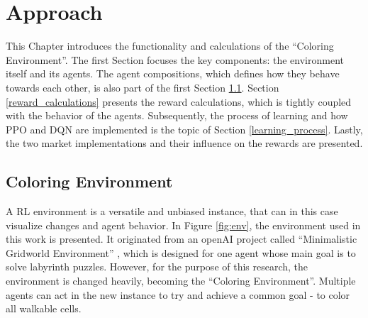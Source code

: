 %
%
\chapter{Approach}\label{sec:Concept}
This Chapter introduces the functionality and calculations of the ``Coloring Environment''. The first Section focuses the key components: the environment itself and its agents. The agent compositions, which defines how they behave towards each other, is also part of the first Section \ref{env}. Section \ref{reward_calculations} presents the reward calculations, which is tightly coupled with the behavior of the agents. Subsequently, the process of learning and how PPO and DQN are implemented is the topic of Section \ref{learning_process}. Lastly, the two market implementations and their influence on the rewards are presented.

\section{Coloring Environment}\label{env}
A RL environment is a versatile and unbiased instance, that can in this case visualize changes and agent behavior.
In Figure \ref{fig:env}, the environment used in this work is presented. It originated from an openAI project called ``Minimalistic Gridworld Environment'' \cite{chwi18}, which is designed for one agent whose main goal is to solve labyrinth puzzles. However, for the purpose of this research, the environment is changed heavily, becoming the ``Coloring Environment''. Multiple agents can act in the new instance to try and achieve a common goal - to color all walkable cells.

